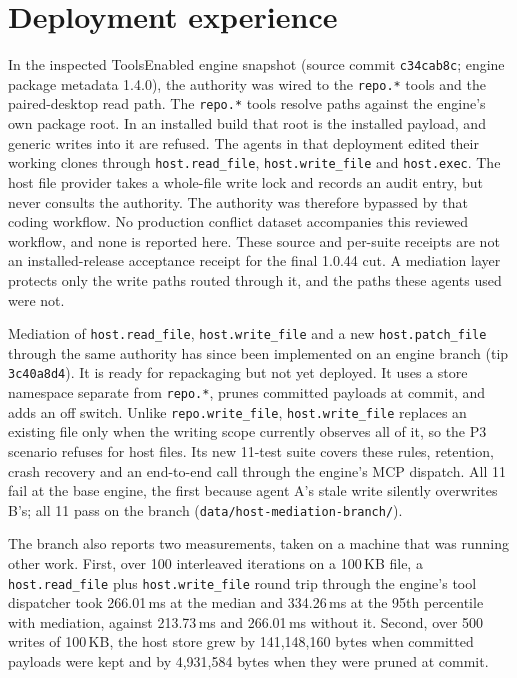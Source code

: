 \documentclass[10pt]{article}
\newcommand{\code}[1]{\texttt{#1}}
\begin{document}
\section{Deployment experience}\label{sec:deploy}

In the inspected ToolsEnabled engine snapshot (source commit \code{c34cab8c}; engine package metadata 1.4.0), the authority was wired to the \code{repo.*} tools and the paired-desktop read path. The \code{repo.*} tools resolve paths against the engine's own package root. In an installed build that root is the installed payload, and generic writes into it are refused. The agents in that deployment edited their working clones through \code{host.read\_file}, \code{host.write\_file} and \code{host.exec}. The host file provider takes a whole-file write lock and records an audit entry, but never consults the authority. The authority was therefore bypassed by that coding workflow. No production conflict dataset accompanies this reviewed workflow, and none is reported here. These source and per-suite receipts are not an installed-release acceptance receipt for the final 1.0.44 cut. A mediation layer protects only the write paths routed through it, and the paths these agents used were not.

Mediation of \code{host.read\_file}, \code{host.write\_file} and a new \code{host.patch\_file} through the same authority has since been implemented on an engine branch (tip \code{3c40a8d4}). It is ready for repackaging but not yet deployed. It uses a store namespace separate from \code{repo.*}, prunes committed payloads at commit, and adds an off switch. Unlike \code{repo.write\_file}, \code{host.write\_file} replaces an existing file only when the writing scope currently observes all of it, so the P3 scenario refuses for host files. Its new 11-test suite covers these rules, retention, crash recovery and an end-to-end call through the engine's MCP dispatch. All 11 fail at the base engine, the first because agent A's stale write silently overwrites B's; all 11 pass on the branch (\code{data/host-mediation-branch/}).

The branch also reports two measurements, taken on a machine that was running other work. First, over 100 interleaved iterations on a 100\,KB file, a \code{host.read\_file} plus \code{host.write\_file} round trip through the engine's tool dispatcher took 266.01\,ms at the median and 334.26\,ms at the 95th percentile with mediation, against 213.73\,ms and 266.01\,ms without it. Second, over 500 writes of 100\,KB, the host store grew by 141,148,160 bytes when committed payloads were kept and by 4,931,584 bytes when they were pruned at commit.
\end{document}
